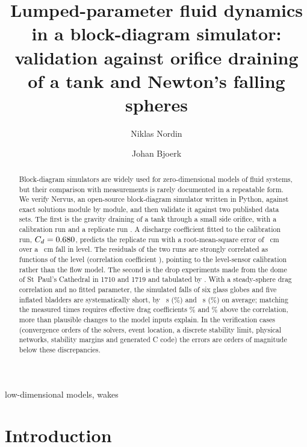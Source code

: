 \documentclass{jfm}
\title{Lumped-parameter fluid dynamics in a block-diagram simulator: validation against orifice draining of a
tank and Newton's falling spheres}
\author{Niklas Nordin\aff{1}\corresp{\email{niklas.nordin@nequam.se}}
 \and Johan Bjoerk\aff{2}}
\affiliation{\aff{1}[Affiliation to be confirmed]
\aff{2}[Affiliation to be confirmed]}
\begin{document}
\maketitle

\begin{abstract}
Block-diagram simulators are widely used for zero-dimensional models of fluid systems, but their comparison with
measurements is rarely documented in a repeatable form. We verify Nervus, an open-source block-diagram simulator
written in Python, against exact solutions module by module, and then validate it against two published data sets.
The first is the gravity draining of a tank through a small side orifice, with a calibration run and a replicate
run \citep{Fabusola2025}. A discharge coefficient fitted to the calibration run, $C_d = 0.680$, predicts the
replicate run with a root-mean-square error of \TestRMSE~cm over a \LevelDrop~cm fall in level. The residuals of
the two runs are strongly correlated as functions of the level (correlation coefficient \ResidCorr), pointing to the
level-sensor calibration rather than the flow model. The second is the drop experiments made from the dome of
St~Paul's Cathedral in 1710 and 1719 and tabulated by \citet{Newton1726}. With a steady-sphere drag correlation and
no fitted parameter, the simulated falls of six glass globes and five inflated bladders are systematically short,
by \GlobeMeanErr~s (\GlobeRel\%) and \BladderMeanErr~s (\BladderRel\%) on average; matching the measured times
requires effective drag coefficients \GlobeCdRatio\% and \BladderCdRatio\% above the correlation, more than
plausible changes to the model inputs explain. In the verification cases (convergence orders of the solvers, event
location, a discrete stability limit, physical networks, stability margins and generated C code) the errors are
orders of magnitude below these discrepancies.
\end{abstract}

\begin{keywords}
low-dimensional models, wakes
\end{keywords}

\section{Introduction}\label{sec:intro}
\end{document}
